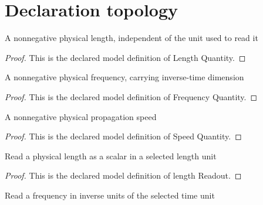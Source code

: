 \section{Declaration topology}
\begin{definition}
  \label{def:physics:phyx-mini-0179:phyxminiproblems-problemphyxmini0179-lengthquantity}
  A nonnegative physical length, independent of the unit used to read it
\end{definition}
\begin{proof}
  This is the declared model definition of Length Quantity.
\end{proof}
\begin{definition}
  \label{def:physics:phyx-mini-0179:phyxminiproblems-problemphyxmini0179-frequencyquantity}
  A nonnegative physical frequency, carrying inverse-time dimension
\end{definition}
\begin{proof}
  This is the declared model definition of Frequency Quantity.
\end{proof}
\begin{definition}
  \label{def:physics:phyx-mini-0179:phyxminiproblems-problemphyxmini0179-speedquantity}
  A nonnegative physical propagation speed
\end{definition}
\begin{proof}
  This is the declared model definition of Speed Quantity.
\end{proof}
\begin{definition}
  \label{def:physics:phyx-mini-0179:phyxminiproblems-problemphyxmini0179-lengthreadout}
  Read a physical length as a scalar in a selected length unit
\end{definition}
\begin{proof}
  This is the declared model definition of length Readout.
\end{proof}
\begin{definition}
  \label{def:physics:phyx-mini-0179:phyxminiproblems-problemphyxmini0179-frequencyreadout}
  Read a frequency in inverse units of the selected time unit
\end{definition}
